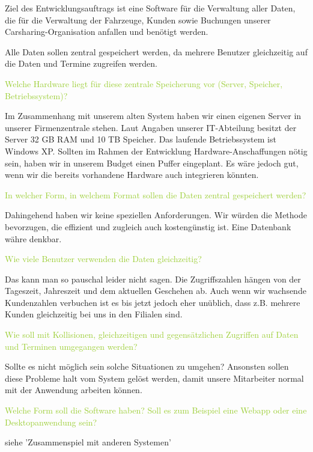 Ziel des Entwicklungsauftrags ist eine Software für die Verwaltung aller Daten, die für die Verwaltung der Fahrzeuge, Kunden sowie Buchungen unserer Carsharing-Organisation anfallen und benötigt werden. 

Alle Daten sollen zentral gespeichert werden, da mehrere Benutzer gleichzeitig auf die Daten und Termine zugreifen werden. 

\textcolor{YellowGreen}{Welche Hardware liegt für diese zentrale Speicherung vor (Server, Speicher, Betriebssystem)?}

\textcolor{NavyBlue}{Im Zusammenhang mit unserem alten System haben wir einen eigenen Server in unserer Firmenzentrale stehen. Laut Angaben unserer IT-Abteilung besitzt der Server 32 GB RAM und 10 TB Speicher. Das laufende Betriebssystem ist Windows XP.
Sollten im Rahmen der Entwicklung Hardware-Anschaffungen nötig sein, haben wir in unserem Budget einen Puffer eingeplant. Es wäre jedoch gut, wenn wir die bereits vorhandene Hardware auch integrieren könnten.}

\textcolor{YellowGreen}{In welcher Form, in welchem Format sollen die Daten zentral gespeichert werden?}

\textcolor{NavyBlue}{Dahingehend haben wir keine speziellen Anforderungen. Wir würden die Methode bevorzugen, die effizient und zugleich auch kostengünstig ist. Eine Datenbank währe denkbar.}

\textcolor{YellowGreen}{Wie viele Benutzer verwenden die Daten gleichzeitig?}

\textcolor{NavyBlue}{Das kann man so pauschal leider nicht sagen. Die Zugriffszahlen hängen von der Tageszeit, Jahreszeit und dem aktuellen Geschehen ab. Auch wenn wir wachsende Kundenzahlen verbuchen ist es bis jetzt jedoch eher unüblich, dass z.B. mehrere Kunden gleichzeitig bei uns in den Filialen sind. }

\textcolor{YellowGreen}{Wie soll mit Kollisionen, gleichzeitigen und gegensätzlichen Zugriffen auf Daten und Terminen umgegangen werden?}

\textcolor{NavyBlue}{Sollte es nicht möglich sein solche Situationen zu umgehen? Ansonsten sollen diese Probleme halt vom System gelöst werden, damit unsere Mitarbeiter normal mit der Anwendung arbeiten können.}

\textcolor{YellowGreen}{Welche Form soll die Software haben? Soll es zum Beispiel eine Webapp oder eine Desktopanwendung sein?}

\textcolor{NavyBlue}{siehe 'Zusammenspiel mit anderen Systemen'}


